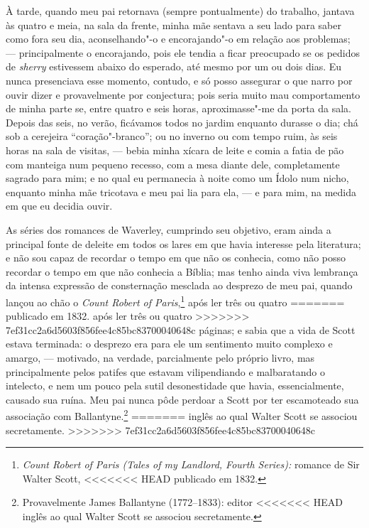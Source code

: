 {{{{{{{{{{{{{%
À tarde, quando meu pai retornava (sempre pontualmente) do trabalho,
jantava às quatro e meia, na sala da frente, minha mãe sentava a seu
lado para saber como fora seu dia, aconselhando"-o e encorajando"-o em
relação aos problemas; --- principalmente o encorajando, pois ele tendia
a ficar preocupado se os pedidos de \textit{sherry} estivessem abaixo do
esperado, até mesmo por um ou dois dias. Eu nunca presenciava esse
momento, contudo, e só posso assegurar o que narro por ouvir dizer e
provavelmente por conjectura; pois seria muito mau comportamento de
minha parte se, entre quatro e seis horas, aproximasse"-me da porta da
sala. Depois das seis, no verão, ficávamos todos no jardim enquanto
durasse o dia; chá sob a cerejeira ``coração"-branco''; ou no inverno ou
com tempo ruim, às seis horas na sala de visitas, --- bebia minha xícara
de leite e comia a fatia de pão com manteiga num pequeno recesso, com a
mesa diante dele, completamente sagrado para mim; e no qual eu
permanecia à noite como um Ídolo num nicho, enquanto minha mãe tricotava
e meu pai lia para ela, --- e para mim, na medida em que eu decidia
ouvir.

As séries dos romances de Waverley, cumprindo seu objetivo, eram
ainda a principal fonte de deleite em todos os lares em que havia
interesse pela literatura; e não sou capaz de recordar o tempo em que
não os conhecia, como não posso recordar o tempo em que não conhecia a
Bíblia; mas tenho ainda viva lembrança da intensa expressão de
consternação mesclada ao desprezo de meu pai, quando lançou ao chão o
\textit{Count Robert of Paris},\footnote{\textit{Count Robert of Paris (Tales
  of my Landlord, Fourth Series):} romance de Sir Walter Scott,
<<<<<<< HEAD
  publicado em 1832.} após ler três ou quatro
=======
  publicado em 1832.  após ler três ou quatro
>>>>>>> 7ef31cc2a6d5603f856fee4c85bc83700040648c
páginas; e sabia que a vida de Scott estava terminada: o desprezo era
para ele um sentimento muito complexo e amargo, --- motivado, na verdade,
parcialmente pelo próprio livro, mas principalmente pelos patifes que
estavam vilipendiando e malbaratando o intelecto, e nem um pouco pela
sutil desonestidade que havia, essencialmente, causado sua ruína. Meu
pai nunca pôde perdoar a Scott por ter escamoteado sua associação com
Ballantyne.\footnote{Provavelmente James Ballantyne (1772--1833): editor
<<<<<<< HEAD
  inglês ao qual Walter Scott se associou secretamente.}
=======
  inglês ao qual Walter Scott se associou secretamente. 
>>>>>>> 7ef31cc2a6d5603f856fee4c85bc83700040648c

}}}}}}}}}}}}}
